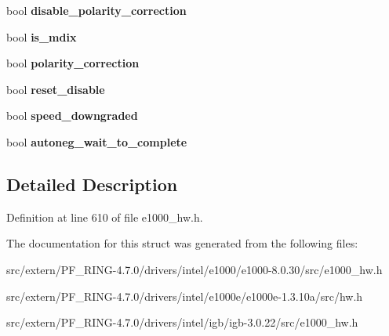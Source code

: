 \begin{DoxyCompactItemize}
\item 
\hypertarget{structe1000__phy__info_a85def08d3b774038aa9f0d5122da8952}{
bool {\bfseries disable\_\-polarity\_\-correction}}
\label{structe1000__phy__info_a85def08d3b774038aa9f0d5122da8952}

\item 
\hypertarget{structe1000__phy__info_a48a5119b377075bf81989ce39e060ad8}{
bool {\bfseries is\_\-mdix}}
\label{structe1000__phy__info_a48a5119b377075bf81989ce39e060ad8}

\item 
\hypertarget{structe1000__phy__info_aca936cab2a6c42569d614dbf34f35805}{
bool {\bfseries polarity\_\-correction}}
\label{structe1000__phy__info_aca936cab2a6c42569d614dbf34f35805}

\item 
\hypertarget{structe1000__phy__info_a02c8dd190fa5c1e46c9207b7a0ad0c6a}{
bool {\bfseries reset\_\-disable}}
\label{structe1000__phy__info_a02c8dd190fa5c1e46c9207b7a0ad0c6a}

\item 
\hypertarget{structe1000__phy__info_a1751c916198973a7896ef5c15b0c9d25}{
bool {\bfseries speed\_\-downgraded}}
\label{structe1000__phy__info_a1751c916198973a7896ef5c15b0c9d25}

\item 
\hypertarget{structe1000__phy__info_a2fff7bb84d84716ceae06f8e8a1b6d13}{
bool {\bfseries autoneg\_\-wait\_\-to\_\-complete}}
\label{structe1000__phy__info_a2fff7bb84d84716ceae06f8e8a1b6d13}

\end{DoxyCompactItemize}


\subsection{Detailed Description}


Definition at line 610 of file e1000\_\-hw.h.



The documentation for this struct was generated from the following files:\begin{DoxyCompactItemize}
\item 
src/extern/PF\_\-RING-\/4.7.0/drivers/intel/e1000/e1000-\/8.0.30/src/e1000\_\-hw.h\item 
src/extern/PF\_\-RING-\/4.7.0/drivers/intel/e1000e/e1000e-\/1.3.10a/src/hw.h\item 
src/extern/PF\_\-RING-\/4.7.0/drivers/intel/igb/igb-\/3.0.22/src/e1000\_\-hw.h\end{DoxyCompactItemize}
